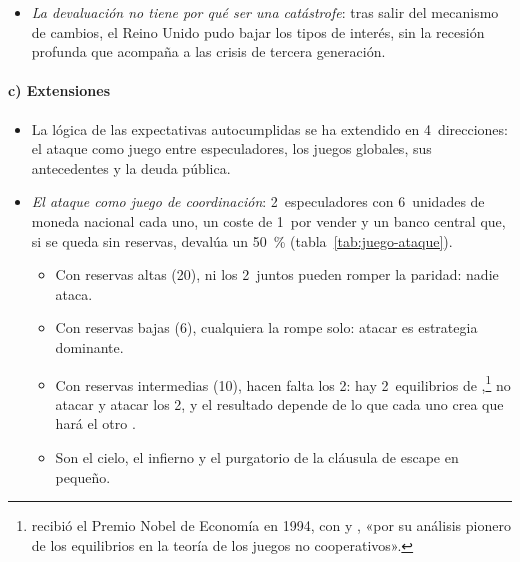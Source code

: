 \documentclass[11pt]{article}
\begin{document}
\begin{itemize}
\begin{itemize}
\begin{itemize}
    \item atarse las manos: subir $\bar c$ con un compromiso más duro, una caja de conversión o una unión monetaria\nocite{GiavazziPagano1988Advantage}  ;
    \item o no prometer lo que no se puede cumplir: dejar flotar.
    \end{itemize}
  \item \emph{La devaluación no tiene por qué ser una catástrofe}: tras salir del mecanismo de cambios, el Reino Unido pudo bajar los tipos de interés, sin la recesión profunda que acompaña a las crisis de tercera generación.
  \end{itemize}
\end{itemize}

\paragraph{c) Extensiones}

\begin{itemize}
\item La lógica de las expectativas autocumplidas se ha extendido en 4~direcciones: el ataque como juego entre especuladores, los juegos globales, sus antecedentes y la deuda pública.
\item \emph{El ataque como juego de coordinación}\nocite{Obstfeld1996}: 2~especuladores con 6~unidades de moneda nacional cada uno, un coste de 1~por vender y un banco central que, si se queda sin reservas, devalúa un 50~\% (tabla~\ref{tab:juego-ataque}).
  \begin{itemize}
  \item Con reservas altas (20), ni los 2~juntos pueden romper la paridad: nadie ataca.
  \item Con reservas bajas (6), cualquiera la rompe solo: atacar es estrategia dominante.
  \item Con reservas intermedias (10), hacen falta los 2: hay 2~equilibrios de ,\footnote{ recibió el Premio Nobel de Economía en 1994, con  y , «por su análisis pionero de los equilibrios en la teoría de los juegos no cooperativos»\nocite{Nobel1994Nash}.} no atacar y atacar los 2, y el resultado depende de lo que cada uno crea que hará el otro .
  \item Son el cielo, el infierno y el purgatorio de la cláusula de escape en pequeño.
  \end{itemize}
\end{itemize}
\end{document}
